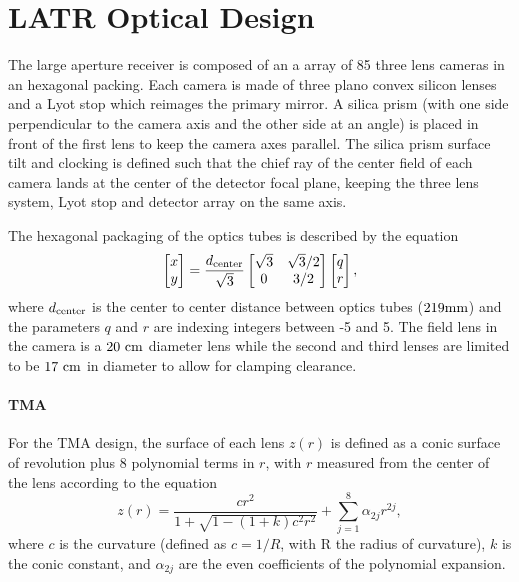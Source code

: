 \documentclass{article}
\begin{document}
\section{LATR Optical Design}

The large aperture receiver is composed of an a array of 85 three lens cameras in an hexagonal packing. Each camera is made of three plano convex silicon lenses and a Lyot stop which reimages the primary mirror. A silica prism (with one side perpendicular to the camera axis and the other side at an angle) is placed in front of the first lens to keep the camera axes parallel. The silica prism surface tilt and clocking is defined such that the chief ray of the center field of each camera lands at the center of the detector focal plane, keeping the three lens system, Lyot stop and detector array on the same axis. 


The hexagonal packaging of the optics tubes is described by the equation \begin{equation}
\begin{bmatrix}x \\ y\end{bmatrix} = \frac{d_{\rm center}}{\sqrt{3}} \begin{bmatrix} \sqrt{3} & \sqrt{3}/2 \\ 0 & 3/2 \end{bmatrix} \begin{bmatrix}q \\ r\end{bmatrix},
\end{equation} where $d_{\rm center}$ is the center to center distance between optics tubes ($219 \rm mm$) and the parameters $q$ and $r$ are indexing integers between -5 and 5. The field lens in the camera is a $20~\rm cm$ diameter lens while the second and third lenses are limited to be $17~\rm cm$ in diameter to allow for clamping clearance. 

\paragraph{TMA}

For the TMA design, the surface of each lens $z(r)$ is defined as a conic surface of revolution plus 8 polynomial terms in $r$, with $r$ measured from the center of the lens according to the equation\begin{equation}
	z(r) = \frac{cr^2}{1+\sqrt{1-(1+k)c^2r^2}} + \sum_{j=1}^{8} \alpha_{2j} r^{2j}, 
\end{equation}
where $c$ is the curvature (defined as $c=1/R$, with R the radius of curvature), $k$ is the conic constant, and $\alpha_{2j}$ are the even coefficients of the polynomial expansion.
\end{document}
